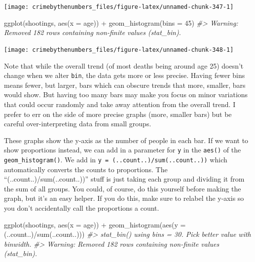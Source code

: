 \documentclass[
]{krantz}
\makeatletter
\newenvironment{Shaded}{\begin{snugshade}}{\end{snugshade}}
\newcommand{\AttributeTok}[1]{\textcolor[rgb]{0.61,0.61,0.61}{#1}}
\newcommand{\CommentTok}[1]{\textcolor[rgb]{0.37,0.37,0.37}{\textit{#1}}}
\newcommand{\DecValTok}[1]{\textcolor[rgb]{0.06,0.06,0.06}{#1}}
\newcommand{\FunctionTok}[1]{\textcolor[rgb]{0,0,0}{#1}}
\newcommand{\NormalTok}[1]{#1}
\newcommand{\SpecialCharTok}[1]{\textcolor[rgb]{0,0,0}{#1}}
\newenvironment{kframe}{%
\medskip{}
\setlength{\fboxsep}{.8em}
 \def\at@end@of@kframe{}%
 \ifinner\ifhmode%
  \def\at@end@of@kframe{\end{minipage}}%
  \begin{minipage}{\columnwidth}%
 \fi\fi%
 \def\FrameCommand##1{\hskip\@totalleftmargin \hskip-\fboxsep
 \colorbox{shadecolor}{##1}\hskip-\fboxsep
     \hskip-\linewidth \hskip-\@totalleftmargin \hskip\columnwidth}%
 \MakeFramed {\advance\hsize-\width
   \@totalleftmargin\z@ \linewidth\hsize
   \@setminipage}}%
 {\par\unskip\endMakeFramed%
 \at@end@of@kframe}
\renewenvironment{Shaded}{\begin{kframe}}{\end{kframe}}
\makeatother
\begin{document}
\begin{center}\texttt{[image: crimebythenumbers\_files/figure-latex/unnamed-chunk-347-1]} \end{center}

\begin{Shaded}
\begin{Highlighting}[]
\FunctionTok{ggplot}\NormalTok{(shootings, }\FunctionTok{aes}\NormalTok{(}\AttributeTok{x =}\NormalTok{ age)) }\SpecialCharTok{+} 
  \FunctionTok{geom\_histogram}\NormalTok{(}\AttributeTok{bins =} \DecValTok{45}\NormalTok{)}
\CommentTok{\#\textgreater{} Warning: Removed 182 rows containing non{-}finite values (stat\_bin).}
\end{Highlighting}
\end{Shaded}

\begin{center}\texttt{[image: crimebythenumbers\_files/figure-latex/unnamed-chunk-348-1]} \end{center}

Note that while the overall trend (of most deaths being around age 25) doesn't change when we alter \texttt{bin}, the data gets more or less precise. Having fewer bins means fewer, but larger, bars which can obscure trends that more, smaller, bars would show. But having too many bars may make you focus on minor variations that could occur randomly and take away attention from the overall trend. I prefer to err on the side of more precise graphs (more, smaller bars) but be careful over-interpreting data from small groups.

These graphs show the y-axis as the number of people in each bar. If we want to show proportions instead, we can add in a parameter for \texttt{y} in the \texttt{aes()} of the \texttt{geom\_histogram()}. We add in \texttt{y\ =\ (..count..)/sum(..count..))} which automatically converts the counts to proportions. The ``(..count..)/sum(..count..))'' stuff is just taking each group and dividing it from the sum of all groups. You could, of course, do this yourself before making the graph, but it's an easy helper. If you do this, make sure to relabel the y-axis so you don't accidentally call the proportions a count.

\begin{Shaded}
\begin{Highlighting}[]
\FunctionTok{ggplot}\NormalTok{(shootings, }\FunctionTok{aes}\NormalTok{(}\AttributeTok{x =}\NormalTok{ age)) }\SpecialCharTok{+} 
  \FunctionTok{geom\_histogram}\NormalTok{(}\FunctionTok{aes}\NormalTok{(}\AttributeTok{y =}\NormalTok{ (..count..)}\SpecialCharTok{/}\FunctionTok{sum}\NormalTok{(..count..)))}
\CommentTok{\#\textgreater{} \textasciigrave{}stat\_bin()\textasciigrave{} using \textasciigrave{}bins = 30\textasciigrave{}. Pick better value with \textasciigrave{}binwidth\textasciigrave{}.}
\CommentTok{\#\textgreater{} Warning: Removed 182 rows containing non{-}finite values (stat\_bin).}
\end{Highlighting}
\end{Shaded}
\end{document}
